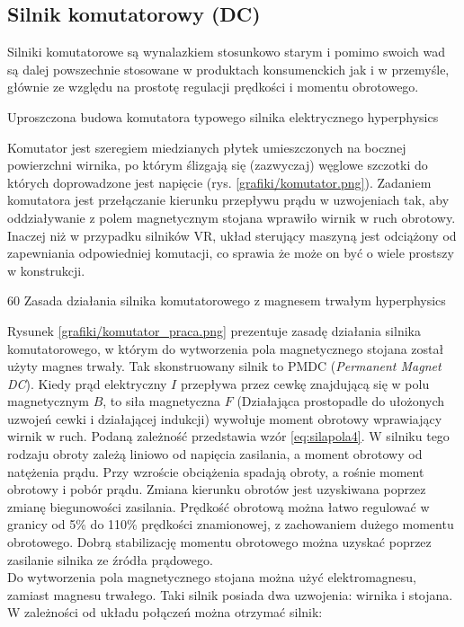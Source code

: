 \subsection{Silnik komutatorowy (DC)}

Silniki komutatorowe są wynalazkiem stosunkowo starym i pomimo swoich wad są dalej powszechnie stosowane w produktach konsumenckich jak i w przemyśle, głównie ze względu na prostotę regulacji prędkości i momentu obrotowego.

		{Uproszczona budowa komutatora typowego silnika elektrycznego}
		{hyperphysics}
		
Komutator jest szeregiem miedzianych płytek umieszczonych na bocznej powierzchni wirnika, po którym ślizgają się (zazwyczaj) węglowe szczotki do których doprowadzone jest napięcie (rys. \ref{grafiki/komutator.png}). Zadaniem komutatora jest przełączanie kierunku przepływu prądu w uzwojeniach tak, aby oddziaływanie z polem magnetycznym stojana wprawiło wirnik w ruch obrotowy. Inaczej niż w przypadku silników VR, układ sterujący maszyną jest odciążony od zapewniania odpowiedniej komutacji, co sprawia że może on być o wiele prostszy w konstrukcji. 

		{60}
		{Zasada działania silnika komutatorowego z magnesem trwałym}
		{hyperphysics}
		
Rysunek \ref{grafiki/komutator_praca.png} prezentuje zasadę działania silnika komutatorowego, w którym do wytworzenia pola magnetycznego stojana został użyty magnes trwały. Tak skonstruowany silnik to PMDC ({\it Permanent Magnet DC}). Kiedy prąd elektryczny $ I $ przepływa przez cewkę znajdującą się w polu magnetycznym $ B $, to siła magnetyczna $ F $ (Działająca prostopadle do ułożonych uzwojeń cewki i działającej indukcji)  wywołuje moment obrotowy wprawiający wirnik w ruch. Podaną zależność przedstawia wzór \ref{eq:silapola4}. W silniku tego rodzaju obroty zależą liniowo od napięcia zasilania, a moment obrotowy od natężenia prądu. Przy wzroście obciążenia spadają obroty, a rośnie moment obrotowy i pobór prądu. Zmiana kierunku obrotów jest uzyskiwana poprzez zmianę biegunowości zasilania. Prędkość obrotową można łatwo regulować w granicy od 5\% do 110\% prędkości znamionowej, z zachowaniem dużego momentu obrotowego. Dobrą stabilizację momentu obrotowego można uzyskać poprzez zasilanie silnika ze źródła prądowego. \\

Do wytworzenia pola magnetycznego stojana można użyć elektromagnesu, zamiast magnesu trwałego. Taki silnik posiada dwa uzwojenia: wirnika i stojana. W zależności od układu połączeń można otrzymać silnik:

